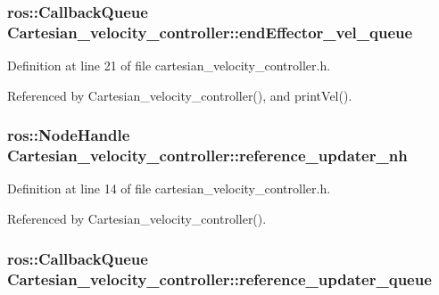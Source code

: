 \hypertarget{classCartesian__velocity__controller_af154b0cda931081b52224eb22e4680f7}{
\subsubsection[{end\-Effector\-\_\-vel\-\_\-queue}]{\setlength{\rightskip}{0pt plus 5cm}ros\-::\-Callback\-Queue Cartesian\-\_\-velocity\-\_\-controller\-::end\-Effector\-\_\-vel\-\_\-queue\hspace{0.3cm}{\ttfamily [protected]}}}\label{classCartesian__velocity__controller_af154b0cda931081b52224eb22e4680f7}


Definition at line 21 of file cartesian\-\_\-velocity\-\_\-controller.\-h.



Referenced by Cartesian\-\_\-velocity\-\_\-controller(), and print\-Vel().

\hypertarget{classCartesian__velocity__controller_a7d04d378a2a6d19870a620883dcd3e09}{
\subsubsection[{reference\-\_\-updater\-\_\-nh}]{\setlength{\rightskip}{0pt plus 5cm}ros\-::\-Node\-Handle Cartesian\-\_\-velocity\-\_\-controller\-::reference\-\_\-updater\-\_\-nh\hspace{0.3cm}{\ttfamily [protected]}}}\label{classCartesian__velocity__controller_a7d04d378a2a6d19870a620883dcd3e09}


Definition at line 14 of file cartesian\-\_\-velocity\-\_\-controller.\-h.



Referenced by Cartesian\-\_\-velocity\-\_\-controller().

\hypertarget{classCartesian__velocity__controller_ad2804cf83a42305d18572abdbbfd1c3f}{
\subsubsection[{reference\-\_\-updater\-\_\-queue}]{\setlength{\rightskip}{0pt plus 5cm}ros\-::\-Callback\-Queue Cartesian\-\_\-velocity\-\_\-controller\-::reference\-\_\-updater\-\_\-queue\hspace{0.3cm}{\ttfamily [protected]}}}\label{classCartesian__velocity__controller_ad2804cf83a42305d18572abdbbfd1c3f}


